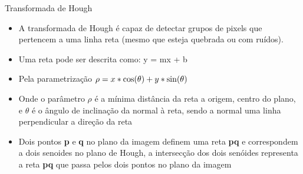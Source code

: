 \begin{frame}{Transformada de Hough}
    \begin{itemize}
        \item A transformada de Hough é capaz de detectar grupos de pixels que pertencem a uma linha reta (mesmo que esteja quebrada ou com ruídos).
        
        \item Uma reta pode ser descrita como:  y = mx + b
        
        \item Pela parametrização $\rho = x \protect\ast \cos(\theta) + y \protect\ast \sin(\theta)$

        
        \item Onde o parâmetro $\rho$ é a mínima distância da reta a origem, centro do plano, e $\theta$ é o ângulo de inclinação da normal à reta, sendo a normal uma linha perpendicular a direção da reta
        
        \item Dois pontos \textbf{p} e \textbf{q} no plano da imagem definem uma reta \textbf{pq} e correspondem a dois senoides no plano de Hough, a intersecção dos dois senóides representa a reta \textbf{pq} que passa pelos dois pontos no plano da imagem
    \end{itemize}
\end{frame}